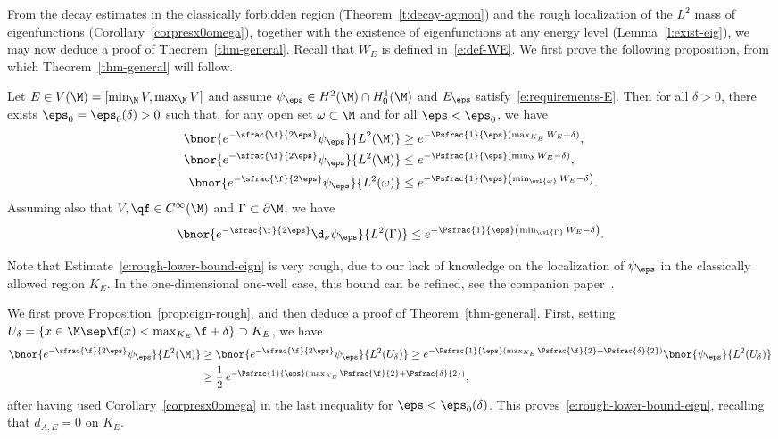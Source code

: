 \label{sectrough}
From the decay estimates in the classically forbidden region (Theorem~\ref{t:decay-agmon}) and the rough localization of the $L^2$ mass of eigenfunctions (Corollary~\ref{corpresx0omega}), together with the existence of eigenfunctions at any energy level (Lemma~\ref{l:exist-eig}), we may now deduce a proof of Theorem~\ref{thm-general}.
Recall that $W_E$ is defined in~\eqref{e:def-WE}. We first prove the following proposition, from which Theorem~\ref{thm-general} will follow.

\begin{proposition}
\label{prop:eign-rough}
Let $E \in V(\M) = [\min_\M V, \max_\M V]$ and assume $\psi_\eps \in H^2(\M) \cap H^1_0(\M)$ and $E_\eps$ satisfy~\eqref{e:requirements-E}.
Then for all $\delta>0$, there exists $\eps_0=\eps_0(\delta)>0$ such that, for any open set $\omega \subset \M$ and for all $\eps<\eps_0$, we have
\begin{align}
\label{e:rough-lower-bound-eign}
\bnor{e^{-\sfrac{\f}{2\eps}} \psi_\eps}{L^2(\M)} &\geq e^{-\Psfrac{1}{\eps}(\max_{K_E}W_E + \delta)},\\
\label{e:upper-bound-eign}
\bnor{e^{-\sfrac{\f}{2\eps}} \psi_\eps}{L^2(\M)} &\leq e^{-\Psfrac{1}{\eps}(\min_{\M} W_E - \delta)}, \\
\label{e:upper-bound-eign-obs}
\bnor{e^{-\sfrac{\f}{2\eps}} \psi_\eps }{L^2(\omega)} &\leq e^{-\Psfrac{1}{\eps} \left( \min_{\ovl{\omega}} W_E -\delta \right)}.
\end{align}
Assuming also that $V, \qf \in C^\infty(\M)$ and $\Gamma\subset \partial\M$, we have
\begin{equation}
\label{e:upper-bound-eign-obs-boundary}
\bnor{e^{-\sfrac{\f}{2\eps}} \d_\nu \psi_\eps }{L^2(\Gamma)} \leq e^{-\Psfrac{1}{\eps} \left( \min_{\ovl{\Gamma}} W_E -\delta \right)}.
\end{equation}
\end{proposition}
Note that Estimate~\eqref{e:rough-lower-bound-eign} is very rough, due to our lack of knowledge on the loca\-lization of $\psi_\eps$ in the classically allowed region $K_E$. In the one-dimensional one-well case, this bound can be refined, see the companion paper~\cite{LL:20-1D}.

We first prove Proposition~\ref{prop:eign-rough}, and then deduce a proof of Theorem~\ref{thm-general}.
First, setting $U_\delta = \{x\in \M\sep \f(x) < \max_{K_E} \f + \delta\} \supset K_E$, we have
\begin{align*}
\bnor{e^{-\sfrac{\f}{2\eps}} \psi_\eps}{L^2(\M)}
& \geq \bnor{e^{-\sfrac{\f}{2\eps}} \psi_\eps}{L^2(U_\delta)} \geq e^{-\Psfrac{1}{\eps}(\max_{K_E}\Psfrac{\f}{2} + \Psfrac{\delta}{2})} \bnor{ \psi_\eps}{L^2(U_\delta)}
\\
& \geq \frac12\,e^{-\Psfrac{1}{\eps}(\max_{K_E}\Psfrac{\f}{2} + \Psfrac{\delta}{2})},
\end{align*}
after having used Corollary~\ref{corpresx0omega} in the last inequality for $\eps < \eps_0(\delta)$. This proves~\eqref{e:rough-lower-bound-eign}, recalling that $d_{A,E} = 0$ on $K_E$.

